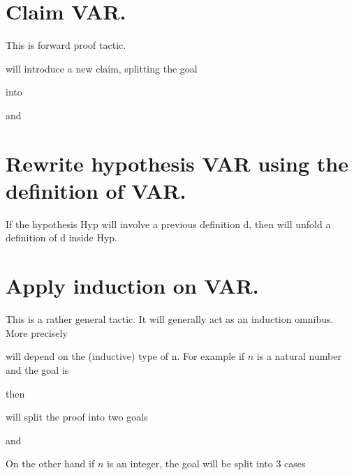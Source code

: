 \section{Claim VAR.}

This is forward proof tactic. 

will introduce a new claim, splitting the goal


into 

and 






\section{Rewrite hypothesis VAR using the definition of VAR.}
If the hypothesis Hyp will involve a previous definition d, then
 will unfold a definition of d inside Hyp.

\section{Apply induction on VAR.}

This is a rather general tactic. It will generally act as an induction omnibus. More precisely

will depend on the (inductive) type of n. For example if $n$ is a natural number and the goal is

 then 

will split the proof into two goals
 
 and 
 
On the other hand if $n$ is an integer, the goal
will be split into 3 cases

